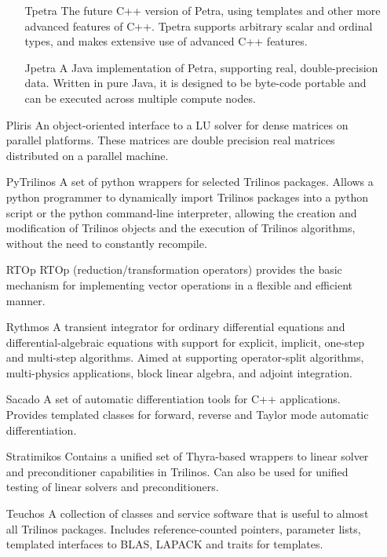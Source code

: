 \begin{itemize}
\begin{itemize}
\item[Tpetra] The future C++ version of Petra, using templates and
other more advanced features of C++.  Tpetra supports arbitrary scalar
and ordinal types, and makes extensive use of advanced C++ features.

\item[Jpetra] A Java implementation of Petra, supporting real,
double-precision data.  Written in pure Java, it is designed to be
byte-code portable and can be executed across multiple compute nodes.

\end{itemize}

\item[Pliris]
An object-oriented interface to a LU solver for dense matrices on
parallel platforms.  These matrices are double precision real
matrices distributed on a parallel machine.

\item[PyTrilinos]
A set of python wrappers for selected Trilinos packages.  Allows a
python programmer to dynamically import Trilinos packages into a python
script or the python command-line interpreter, allowing the creation
and modification of Trilinos objects and the execution of Trilinos
algorithms, without the need to constantly recompile.

\item[RTOp]
RTOp (reduction/transformation operators) provides the basic mechanism
for implementing vector operations in a flexible and efficient manner.

\item[Rythmos]
A transient integrator for ordinary differential equations and
differential-algebraic equations with support for explicit, implicit,
one-step and multi-step algorithms.  Aimed at supporting operator-split
algorithms, multi-physics applications, block linear algebra, and
adjoint integration.

\item[Sacado]
A set of automatic differentiation tools for C++ applications.  Provides
templated classes for forward, reverse and Taylor mode automatic
differentiation.

\item[Stratimikos]
Contains a unified set of Thyra-based wrappers to linear solver and
preconditioner capabilities in Trilinos.  Can also be used for unified
testing of linear solvers and preconditioners.

\item[Teuchos] A collection of classes and service software that is
useful to almost all Trilinos packages.  Includes
reference-counted pointers, parameter lists, templated interfaces to
BLAS, LAPACK and traits for templates.  


\end{itemize}
